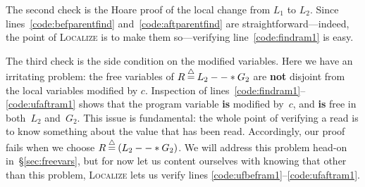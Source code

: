 The second check is the Hoare proof of the local
change from $L_1$ to $L_2$.  Since lines~\ref{code:befparentfind} and~\ref{code:aftparentfind}
are straightforward---indeed, the point of \textsc{Localize} is to make them
so---verifying line~\ref{code:findram1} is easy.

The third check is the side condition on the modified variables.  Here we have an irritating
problem: the free variables of $R \mathbin{\stackrel{\triangle}{=}} L_2 --* G_2$ are \textbf{not} disjoint from
the local variables modified by $c$.  Inspection of lines~\ref{code:findram1}--\ref{code:ufaftram1} shows that the program variable  \textbf{is} modified by~$c$,
and \textbf{is} free in both~$L_2$ and~$G_2$.
This issue is fundamental: the whole point of verifying
a read is to know something about the value that has been read.
Accordingly, our proof fails when we choose $R \mathbin{\stackrel{\triangle}{=}} (L_2 --* G_2)$.
We will address this problem
head-on in~\S\ref{sec:freevars}, but for now let us content ourselves with knowing
that other than this problem, \textsc{Localize} lets us verify
lines \ref{code:ufbefram1}--\ref{code:ufaftram1}.






